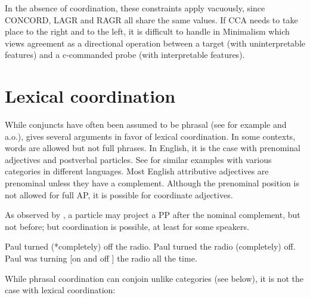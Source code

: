 \documentclass[output=paper]{langsci/langscibook}
\begin{document}
\noindent
In the absence of coordination, these constraints apply vacuously, since CONCORD, LAGR and RAGR all share the same values.
If CCA needs to take place to the right and to the left, it is difficult to handle in Minimalism which views agreement as a directional operation between a target (with uninterpretable features) and a c-commanded probe (with interpretable features). 


\section{Lexical coordination}\label{lexcoord}


While conjuncts have often been assumed to be phrasal (see for example \citet{Kayne:94} and \citet{bruening} a.o.), \citet{Abeille:06} gives several arguments in favor of lexical coordination.
In some contexts, words are allowed but not full phrases. In English, it is the case with prenominal adjectives and postverbal particles. See \citet{Abeille:06} for similar examples with various categories in different languages. Most English attributive adjectives are prenominal unless they have a complement. Although the prenominal position is not allowed for full AP, it is possible for coordinate adjectives.

\begin{exe}
 \ex
\begin{xlista}
\end{xlista}
\end{exe}

As observed by \citet{hpsg1}, a particle may project a  PP  after the nominal complement, but not before; but coordination is possible, at least for some speakers.

\begin{exe}
 \ex
\begin{xlista}
\ex Paul turned (*completely) off the radio.
\ex Paul turned the radio (completely) off.
\ex Paul was turning [on and off ] the radio all the time.
\end{xlista}
\end{exe}

While phrasal coordination can conjoin unlike categories (see below), it is not the case with lexical coordination:

\begin{exe}
 \ex
\begin{xlista}
\end{xlista}
\end{exe}
\end{document}
